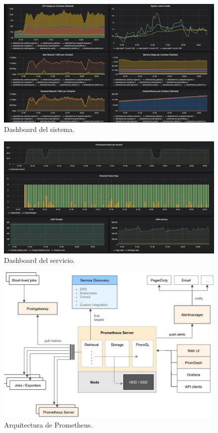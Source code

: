 \documentclass[a4paper,12pt, oneside]{article}
\begin{document}
\begin{figure}[h!]
	\centering
	\includegraphics[width=1.45\textwidth,angle=90]{./graph/system_dashboard.png}
	\caption{Dashboard del sistema.}
	\label{diag:system_dashbard}
\end{figure}

\begin{figure}[h]
	\centering
	\includegraphics[width=1.5\textwidth,angle=90]{./graph/service_dashboard.png}
	\caption{Dashboard del servicio.}
	\label{diag:service_dashboard}
\end{figure}

\begin{figure}[h]
	\centering
	\includegraphics[width=1.2\textwidth,angle=90]{./graph/prometheus.jpeg}
	\caption{Arquitectura de Prometheus.}
	\label{diag:prometheus}
\end{figure}

\clearpage

\listoffigures

\clearpage

\nocite{*}
\printbibliography
\end{document}
